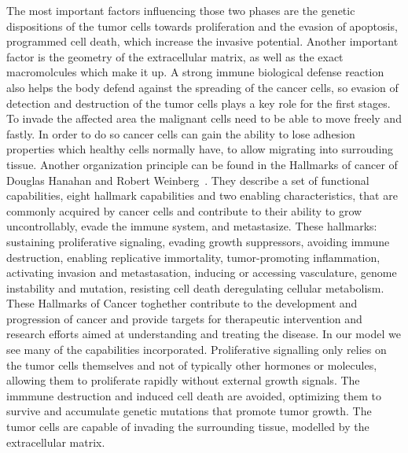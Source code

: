The most important factors influencing those two phases are the genetic dispositions of the tumor cells towards proliferation and the evasion of apoptosis, programmed cell death, which increase the invasive potential. Another important factor is the geometry of the extracellular matrix, as well as the exact macromolcules which make it up. A strong immune biological defense reaction also helps the body defend against the spreading of the cancer cells, so evasion of detection and destruction of the tumor cells plays a key role for the first stages. To invade the affected area the malignant cells need to be able to move freely and fastly. In order to do so cancer cells can gain the ability to lose adhesion properties which healthy cells normally have, to allow migrating into surrouding tissue. 
Another organization principle can be found in the Hallmarks of cancer of Douglas Hanahan and Robert Weinberg~\cite{10.1158/2159-8290.CD-21-1059}. They describe a set of functional capabilities, eight hallmark capabilities and two enabling characteristics, that are commonly acquired by cancer cells and contribute to their ability to grow uncontrollably, evade the immune system, and metastasize. These hallmarks: sustaining proliferative signaling, evading growth suppressors, avoiding immune destruction, enabling replicative immortality, tumor-promoting inflammation, activating invasion and metastasation, inducing or accessing vasculature, genome instability and mutation, resisting cell death deregulating cellular metabolism. These Hallmarks of Cancer toghether contribute to the development and progression of cancer and provide targets for therapeutic intervention and research efforts aimed at understanding and treating the disease. 
In our model we see many of the capabilities incorporated. Proliferative signalling only relies on the tumor cells themselves and not of typically other hormones or molecules, allowing them to proliferate rapidly without external growth signals. The immmune destruction and induced cell death are avoided, optimizing them to survive and accumulate genetic mutations that promote tumor growth. The tumor cells are capable of invading the surrounding tissue, modelled by the extracellular matrix.

